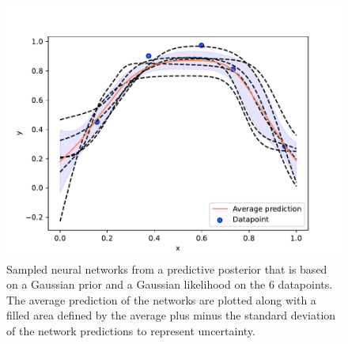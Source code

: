 \begin{figure}
    \centering
    \includegraphics[width=\textwidth,height=\textheight,keepaspectratio]{pics/figure_simple_BNN.pdf}
    \caption{Sampled neural networks from a predictive posterior that is based on a Gaussian prior and a Gaussian likelihood on the 6 datapoints. The average prediction of the networks are plotted along with a filled area defined by the average plus minus the standard deviation of the network predictions to represent uncertainty.}
    \label{fig:simple_BNN}
\end{figure}

